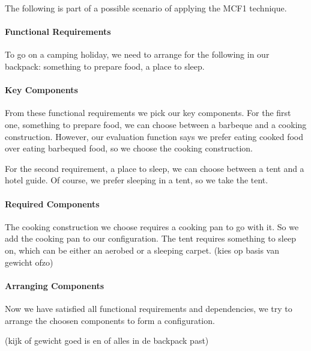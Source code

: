 \documentclass[a4paper,11pt]{article}
\begin{document}
The following is part of a possible scenario of applying the
MCF1 technique.

\paragraph{Functional Requirements}

To go on a camping holiday, we need to arrange for the following
in our backpack: something to prepare food, a place to sleep.

\paragraph{Key Components}

From these functional requirements we pick our key components. For
the first one, something to prepare food, we can choose between a
barbeque and a cooking construction. However, our evaluation
function says we prefer eating cooked food over eating barbequed
food, so we choose the cooking construction.

For the second requirement, a place to sleep, we can choose between
a tent and a hotel guide. Of course, we prefer sleeping in a tent,
so we take the tent.

\paragraph{Required Components}

The cooking construction we choose requires a cooking pan to go
with it. So we add the cooking pan to our configuration. The tent
requires something to sleep on, which can be either an aerobed or
a sleeping carpet. (kies op basis van gewicht ofzo)

\paragraph{Arranging Components}

Now we have satisfied all functional requirements and dependencies,
we try to arrange the choosen components to form a configuration.

(kijk of gewicht goed is en of alles in de backpack past)
\end{document}
